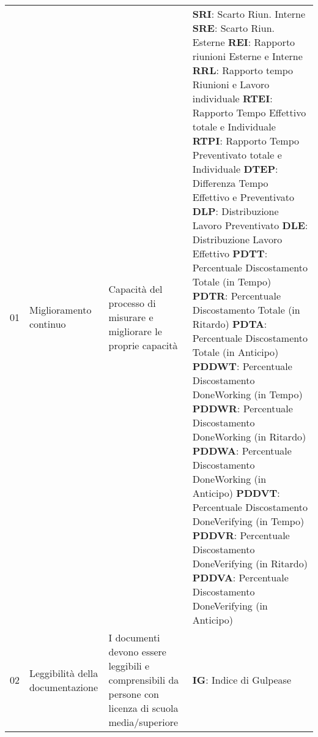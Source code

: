 \begin{longtable}{
		>{}p{}
		>{}p{}
        >{}p{}
        >{\centering}p{} }
        01 & Miglioramento continuo & Capacità del processo di misurare e migliorare le proprie capacità &
                         \textbf{SRI}: Scarto Riun. Interne \newline
                         \textbf{SRE}: Scarto Riun. Esterne \newline
                         \textbf{REI}: Rapporto riunioni Esterne e Interne \newline
                         \textbf{RRL}: Rapporto tempo Riunioni e Lavoro individuale \newline
                         \textbf{RTEI}: Rapporto Tempo Effettivo totale e Individuale \newline
                         \textbf{RTPI}: Rapporto Tempo Preventivato totale e Individuale \newline
                         \textbf{DTEP}: Differenza Tempo Effettivo e Preventivato \newline
                         \textbf{DLP}: Distribuzione Lavoro Preventivato \newline
                         \textbf{DLE}: Distribuzione Lavoro Effettivo \newline
                         \textbf{PDTT}: Percentuale Discostamento Totale (in Tempo) \newline
                         \textbf{PDTR}: Percentuale Discostamento Totale (in Ritardo) \newline
                         \textbf{PDTA}: Percentuale Discostamento Totale (in Anticipo) \newline
                         \textbf{PDDWT}: Percentuale Discostamento DoneWorking (in Tempo) \newline
                         \textbf{PDDWR}: Percentuale Discostamento DoneWorking (in Ritardo) \newline
                         \textbf{PDDWA}: Percentuale Discostamento DoneWorking (in Anticipo) \newline
                         \textbf{PDDVT}: Percentuale Discostamento DoneVerifying (in Tempo) \newline
                         \textbf{PDDVR}: Percentuale Discostamento DoneVerifying (in Ritardo) \newline
                         \textbf{PDDVA}: Percentuale Discostamento DoneVerifying (in Anticipo)
                         \tabularnewline

        02 & Leggibilità della documentazione & I documenti devono essere leggibili e comprensibili da persone con licenza di scuola media/superiore & \textbf{IG}: Indice di Gulpease \tabularnewline


\end{longtable}
